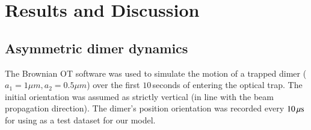 \documentclass[final, 3p]{elsarticle}
\begin{document}
\section{Results and  Discussion}
\label{sec:Discussion}


\subsection{Asymmetric dimer dynamics}
\label{sec:3.1}

The Brownian OT software was used to simulate the motion of a trapped
dimer ($a_1=1\mu m, a_2=0.5\mu m$) over the first $10$\,seconds of
entering the optical trap.  The initial orientation was assumed as
strictly vertical (in line with the beam propagation direction). The
dimer's position orientation was recorded every $10\,{\rm \mu s}$ for
using as a test dataset for our model.
\end{document}
